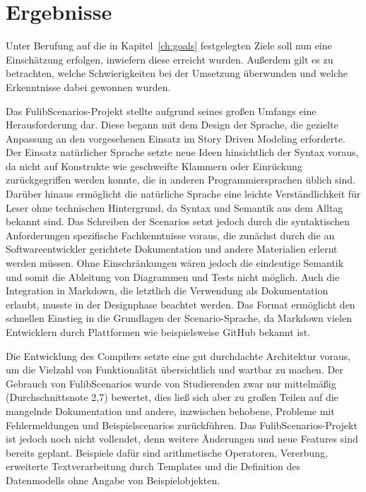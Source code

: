 \chapter{Ergebnisse}\label{ch:ergebnisse}

Unter Berufung auf die in Kapitel~\ref{ch:goals} festgelegten Ziele soll nun eine Einschätzung erfolgen, inwiefern diese erreicht wurden.
Außerdem gilt es zu betrachten, welche Schwierigkeiten bei der Umsetzung überwunden und welche Erkenntnisse dabei gewonnen wurden.

Das FulibScenarios-Projekt stellte aufgrund seines großen Umfangs eine Herausforderung dar.
Diese begann mit dem Design der Sprache, die gezielte Anpassung an den vorgesehenen Einsatz im Story Driven Modeling erforderte.
Der Einsatz natürlicher Sprache setzte neue Ideen hinsichtlich der Syntax voraus, da nicht auf Konstrukte wie geschweifte Klammern oder Einrückung zurückgegriffen werden konnte, die in anderen Programmiersprachen üblich sind.
Darüber hinaus ermöglicht die natürliche Sprache eine leichte Verständlichkeit für Leser ohne technischen Hintergrund, da Syntax und Semantik aus dem Alltag bekannt sind.
Das Schreiben der Scenarios setzt jedoch durch die syntaktischen Anforderungen spezifische Fachkenntnisse voraus, die zunächst durch die an Softwareentwickler gerichtete Dokumentation und andere Materialien erlernt werden müssen.
Ohne Einschränkungen wären jedoch die eindeutige Semantik und somit die Ableitung von Diagrammen und Tests nicht möglich.
Auch die Integration in Markdown, die letztlich die Verwendung als Dokumentation erlaubt, musste in der Designphase beachtet werden.
Das Format ermöglicht den schnellen Einstieg in die Grundlagen der Scenario-Sprache, da Markdown vielen Entwicklern durch Plattformen wie beispielsweise GitHub bekannt ist.

Die Entwicklung des Compilers setzte eine gut durchdachte Architektur voraus, um die Vielzahl von Funktionalität übersichtlich und wartbar zu machen.
Der Gebrauch von FulibScenarios wurde von Studierenden zwar nur mittelmäßig (Durchschnittsnote 2,7) bewertet, dies ließ sich aber zu großen Teilen auf die mangelnde Dokumentation und andere, inzwischen behobene, Probleme mit Fehlermeldungen und Beispielscenarios zurückführen.
Das FulibScenarios-Projekt ist jedoch noch nicht vollendet, denn weitere Änderungen und neue Features sind bereits geplant.
Beispiele dafür sind arithmetische Operatoren, Vererbung, erweiterte Textverarbeitung durch Templates und die Definition des Datenmodells ohne Angabe von Beispielobjekten.

